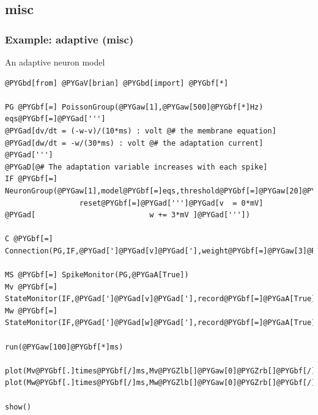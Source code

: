 \documentclass[letterpaper,10pt,english]{manual}
\begin{document}
\subsection{misc}

\resetcurrentobjects
\hypertarget{--doc-examples-misc_adaptive}{}

\hypertarget{index-57}{}\subsubsection{Example: adaptive (misc)}

An adaptive neuron model

\begin{Verbatim}[commandchars=@\[\]]
@PYGbd[from] @PYGaV[brian] @PYGbd[import] @PYGbf[*]

PG @PYGbf[=] PoissonGroup(@PYGaw[1],@PYGaw[500]@PYGbf[*]Hz)
eqs@PYGbf[=]@PYGad[''']
@PYGad[dv/dt = (-w-v)/(10*ms) : volt @# the membrane equation]
@PYGad[dw/dt = -w/(30*ms) : volt @# the adaptation current]
@PYGad[''']
@PYGaD[@# The adaptation variable increases with each spike]
IF @PYGbf[=] NeuronGroup(@PYGaw[1],model@PYGbf[=]eqs,threshold@PYGbf[=]@PYGaw[20]@PYGbf[*]mV,
                 reset@PYGbf[=]@PYGad[''']@PYGad[v  = 0*mV]
@PYGad[                          w += 3*mV ]@PYGad['''])

C @PYGbf[=] Connection(PG,IF,@PYGad[']@PYGad[v]@PYGad['],weight@PYGbf[=]@PYGaw[3]@PYGbf[*]mV)

MS @PYGbf[=] SpikeMonitor(PG,@PYGaA[True])
Mv @PYGbf[=] StateMonitor(IF,@PYGad[']@PYGad[v]@PYGad['],record@PYGbf[=]@PYGaA[True])
Mw @PYGbf[=] StateMonitor(IF,@PYGad[']@PYGad[w]@PYGad['],record@PYGbf[=]@PYGaA[True])

run(@PYGaw[100]@PYGbf[*]ms)

plot(Mv@PYGbf[.]times@PYGbf[/]ms,Mv@PYGZlb[]@PYGaw[0]@PYGZrb[]@PYGbf[/]mV)
plot(Mw@PYGbf[.]times@PYGbf[/]ms,Mw@PYGZlb[]@PYGaw[0]@PYGZrb[]@PYGbf[/]mV)

show()
\end{Verbatim}

\resetcurrentobjects
\hypertarget{--doc-examples-misc_adaptive_threshold}{}
\end{document}
